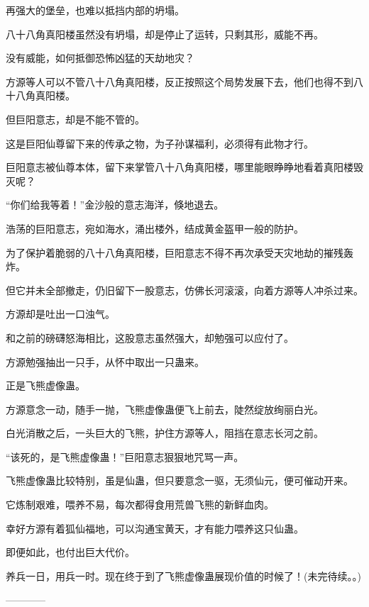 \begin{this_body}
再强大的堡垒，也难以抵挡内部的坍塌。

八十八角真阳楼虽然没有坍塌，却是停止了运转，只剩其形，威能不再。

没有威能，如何抵御恐怖凶猛的天劫地灾？

方源等人可以不管八十八角真阳楼，反正按照这个局势发展下去，他们也得不到八十八角真阳楼。

但巨阳意志，却是不能不管的。

这是巨阳仙尊留下来的传承之物，为子孙谋福利，必须得有此物才行。

巨阳意志被仙尊本体，留下来掌管八十八角真阳楼，哪里能眼睁睁地看着真阳楼毁灭呢？

“你们给我等着！”金沙般的意志海洋，倏地退去。

浩荡的巨阳意志，宛如海水，涌出楼外，结成黄金盔甲一般的防护。

为了保护着脆弱的八十八角真阳楼，巨阳意志不得不再次承受天灾地劫的摧残轰炸。

但它并未全部撤走，仍旧留下一股意志，仿佛长河滚滚，向着方源等人冲杀过来。

方源却是吐出一口浊气。

和之前的磅礴怒海相比，这股意志虽然强大，却勉强可以应付了。

方源勉强抽出一只手，从怀中取出一只蛊来。

正是飞熊虚像蛊。

方源意念一动，随手一抛，飞熊虚像蛊便飞上前去，陡然绽放绚丽白光。

白光消散之后，一头巨大的飞熊，护住方源等人，阻挡在意志长河之前。

“该死的，是飞熊虚像蛊！”巨阳意志狠狠地咒骂一声。

飞熊虚像蛊比较特别，虽是仙蛊，但只要意念一驱，无须仙元，便可催动开来。

它炼制艰难，喂养不易，每次都得食用荒兽飞熊的新鲜血肉。

幸好方源有着狐仙福地，可以沟通宝黄天，才有能力喂养这只仙蛊。

即便如此，也付出巨大代价。

养兵一日，用兵一时。现在终于到了飞熊虚像蛊展现价值的时候了！(未完待续。。)

------------

\end{this_body}

